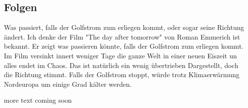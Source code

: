 \subsection{Folgen}

Was passiert, falls der Golfstrom zum erliegen kommt, oder sogar seine Richtung ändert.
Ich denke der Film "The day after tomorrow" von Roman Emmerich ist bekannt. Er zeigt was passieren könnte, falls der Golfstrom zum erliegen kommt. 
Im Film versinkt innert weniger Tage die ganze Welt in einer neuen Eiszeit un alles endet im Chaos. 
Das ist natürlich ein wenig übertrieben Dargestellt, doch die Richtung stimmt. Falls der Golfstrom stoppt, würde trotz Klimaerwärmung Nordeuropa um einige Grad kälter werden.


more text coming soon
